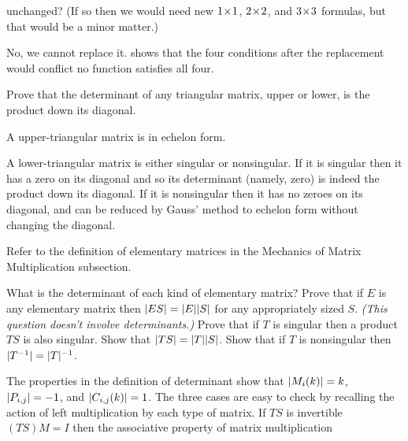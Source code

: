 \begin{exercises}
    unchanged?
    (If so then we would need new $1 \! \times \! 1$,
     $2 \! \times \! 2$, and $3 \! \times \! 3$ formulas, but that would be a minor matter.)
     \begin{answer}
       No, we cannot replace it.
       shows that the four conditions after the replacement would  
       conflict \Dash  no function satisfies all four.
     \end{answer}
  \item 
    Prove that the determinant of any triangular matrix, upper or lower,
    is the product down its diagonal.
    \begin{answer}
      A upper-triangular matrix is in echelon form.

      A lower-triangular matrix is either singular or nonsingular.
      If it is singular then it has a zero on its diagonal and so its 
      determinant (namely, zero) is indeed the product down its diagonal. 
      If it is nonsingular then it has no zeroes on its diagonal, and
      can be reduced by Gauss' method to echelon
      form without changing the diagonal.  
    \end{answer}
  \item
    Refer to the definition of elementary matrices in the Mechanics
    of Matrix Multiplication subsection.
    \begin{exparts}
      \partsitem What is the determinant of each kind of elementary matrix?
      \partsitem Prove that if \( E \) is any elementary matrix then
        \( \deter{ES}=\deter{E}\deter{S} \) for any appropriately sized
        \( S \).
      \partsitem \textit{(This question doesn't involve determinants.)}
        Prove that if \( T \) is singular then a product \( TS \) is
        also singular.
      \partsitem Show that \( \deter{TS}=\deter{T}\deter{S} \).
      \partsitem Show that if \( T \) is nonsingular then
          \( \deter{T^{-1}}=\deter{T}^{-1} \).
    \end{exparts}
    \begin{answer}
      \begin{exparts}
        \partsitem The properties in the definition of determinant 
          show that 
          \( \deter{M_i(k)}=k \),
          \( \deter{P_{i,j}}=-1 \),
          and
          \( \deter{C_{i,j}(k)}=1 \).
        \partsitem The three cases are easy to check by recalling the action
          of left multiplication by each type of matrix.
        \partsitem If \( TS \) is invertible \( (TS)M=I \) then
          the associative property of matrix multiplication 

\end{exparts}
\end{answer}
\end{exercises}

